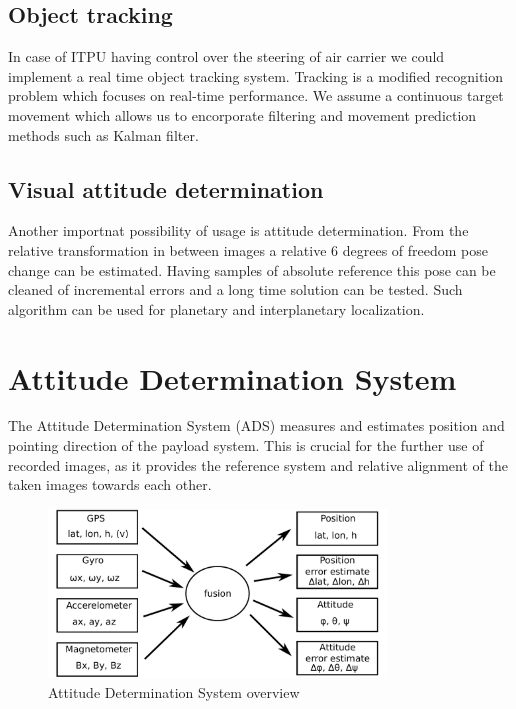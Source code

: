 \subsection{Object tracking}
In case of ITPU having control over the steering of air carrier we could implement a real time object tracking system.
Tracking is a modified recognition problem which focuses on real-time performance. We assume a continuous target
movement which allows us to encorporate filtering and movement prediction methods such as Kalman filter. 

\subsection{Visual attitude determination}
Another importnat possibility of usage is attitude determination. From the relative transformation in between images a relative
6 degrees of freedom pose change can be estimated. Having samples of absolute reference this pose can be cleaned
of incremental errors and a long time solution can be tested. Such algorithm can be used for planetary and interplanetary
localization.


\FloatBarrier
\section{Attitude Determination System}

The Attitude Determination System (ADS) measures and estimates position and pointing direction of the payload system.
This is crucial for the further use of recorded images, as it provides the reference system and relative alignment of the taken images towards each other.

\begin{figure}
\centering
\includegraphics[width=0.8\textwidth]{figures/ADS_diagram.pdf}
\caption{Attitude Determination System overview}
\label{fig:ADS_overview}
\end{figure}

\pagebreak

